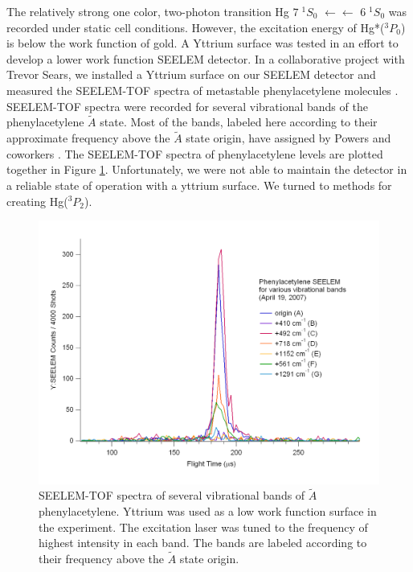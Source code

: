 \documentclass[12pt]{mitthesis}
\begin{document}
The relatively strong one color, two-photon transition Hg $7 \; ^1S_0$
$\leftarrow\leftarrow$ $6 \; ^1S_0$ was recorded under static cell
conditions.  However, the excitation energy of Hg*($^3P_0$) is below
the work function of gold.  A Yttrium surface was tested in an effort
to develop a lower work function SEELEM detector.  In a collaborative
project with Trevor Sears, we installed a Yttrium surface on our
SEELEM detector and measured the SEELEM-TOF spectra of metastable
phenylacetylene molecules \cite{hofstein08}.  SEELEM-TOF spectra were
recorded for several vibrational bands of the phenylacetylene
$\tilde{A}$ state.  Most of the bands, labeled here according to their
approximate frequency above the $\tilde{A}$ state origin, have
assigned by Powers and coworkers \cite{powers81}.  The SEELEM-TOF
spectra of phenylacetylene levels are plotted together in Figure
\ref{fig:phenylacetylene-tofs}.  Unfortunately, we were not able to
maintain the detector in a reliable state of operation with a yttrium
surface.  We turned to methods for creating Hg($^3P_2$).

\begin{figure}
  \caption{SEELEM-TOF spectra of several vibrational bands of
    $\tilde{A}$ phenylacetylene.  Yttrium was used as a low work
    function surface in the experiment.  The excitation laser was
    tuned to the frequency of highest intensity in each band.  The
    bands are labeled according to their frequency above the
    $\tilde{A}$ state origin.}
  \label{fig:phenylacetylene-tofs}
  \centering
  \includegraphics[width=8in,angle=90]{phenylacetylene-tofs.pdf}
\end{figure}
\end{document}
